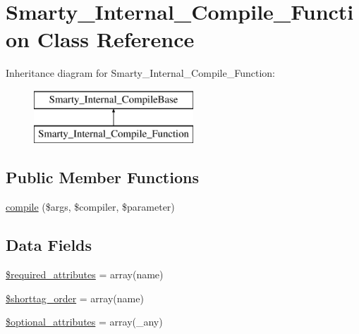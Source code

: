 \hypertarget{class_smarty___internal___compile___function}{}\section{Smarty\+\_\+\+Internal\+\_\+\+Compile\+\_\+\+Function Class Reference}
\label{class_smarty___internal___compile___function}
Inheritance diagram for Smarty\+\_\+\+Internal\+\_\+\+Compile\+\_\+\+Function\+:\begin{figure}[H]
\begin{center}
\leavevmode
\includegraphics[height=2.000000cm]{class_smarty___internal___compile___function}
\end{center}
\end{figure}
\subsection*{Public Member Functions}
\begin{DoxyCompactItemize}
\item 
\hyperlink{class_smarty___internal___compile___function_a84998958b9fc8c11c2ebe9620a49b853}{compile} (\$args, \$compiler, \$parameter)
\end{DoxyCompactItemize}
\subsection*{Data Fields}
\begin{DoxyCompactItemize}
\item 
\hyperlink{class_smarty___internal___compile___function_ae799507d5461de485f3a618abeecea95}{\$required\+\_\+attributes} = array(\textquotesingle{}name\textquotesingle{})
\item 
\hyperlink{class_smarty___internal___compile___function_a2ccb25269c3a92e8c4796c7ef23725e6}{\$shorttag\+\_\+order} = array(\textquotesingle{}name\textquotesingle{})
\item 
\hyperlink{class_smarty___internal___compile___function_a899d1eb4a6fecbd6ce696adb171c80a4}{\$optional\+\_\+attributes} = array(\textquotesingle{}\+\_\+any\textquotesingle{})
\end{DoxyCompactItemize}


